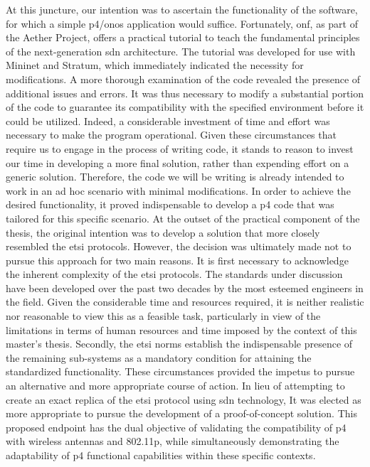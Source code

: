 At this juncture, our intention was to ascertain the functionality of the software, for which a simple \gls{p4}/\gls{onos} application would suffice. Fortunately, \gls{onf}, as part of the Aether Project, offers a practical tutorial to teach the fundamental principles of the next-generation \gls{sdn} architecture. The tutorial was developed for use with Mininet and Stratum, which immediately indicated the necessity for modifications. A more thorough examination of the code revealed the presence of additional issues and errors. It was thus necessary to modify a substantial portion of the code to guarantee its compatibility with the specified environment before it could be utilized. Indeed, a considerable investment of time and effort was necessary to make the program operational. Given these circumstances that require us to engage in the process of writing code, it stands to reason to invest our time in developing a more final solution, rather than expending effort on a generic solution. Therefore, the code we will be writing is already intended to work in an ad hoc scenario with minimal modifications.
In order to achieve the desired functionality, it proved indispensable to develop a \gls{p4} code that was tailored for this specific scenario. At the outset of the practical component of the thesis, the original intention was to develop a solution that more closely resembled the \gls{etsi} protocols. However, the decision was ultimately made not to pursue this approach for two main reasons. It is first necessary to acknowledge the inherent complexity of the \gls{etsi} protocols. The standards under discussion have been developed over the past two decades by the most esteemed engineers in the field. Given the considerable time and resources required, it is neither realistic nor reasonable to view this as a feasible task, particularly in view of the limitations in terms of human resources and time imposed by the context of this master's thesis. Secondly, the \gls{etsi} norms establish the indispensable presence of the remaining sub-systems as a mandatory condition for attaining the standardized functionality. These circumstances provided the impetus to pursue an alternative and more appropriate course of action. 
In lieu of attempting to create an exact replica of the \gls{etsi} protocol using \gls{sdn} technology, It was elected as more appropriate to pursue the development of a proof-of-concept solution. This proposed endpoint has the dual objective of validating the compatibility of \gls{p4} with wireless antennas and 802.11p, while simultaneously demonstrating the adaptability of \gls{p4} functional capabilities within these specific contexts. 
